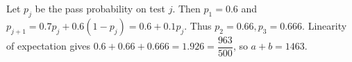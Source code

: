 Let $p_j$ be the pass probability on test $j$. Then $p_1=0.6$ and $p_{j+1}=0.7p_j+0.6(1-p_j)=0.6+0.1p_j$. Thus $p_2=0.66,p_3=0.666$. Linearity of expectation gives $0.6+0.66+0.666=1.926=\dfrac{963}{500}$, so $\boxed{a+b=1463}$.
